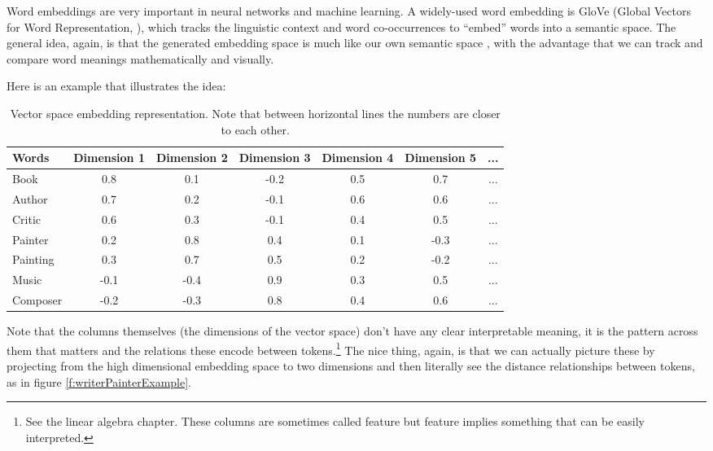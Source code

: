 Word embeddings are very important in neural networks and machine learning. A widely-used word embedding is GloVe (Global Vectors for Word Representation, \cite{pennington2014glove}), which tracks the linguistic context and word co-occurrences to ``embed'' words into a semantic space. The general idea, again, is that the generated embedding space is much like our own semantic space \cite{lewis2019distributional}, with the advantage that we can track and compare word meanings mathematically and visually.

Here is an example that illustrates the idea:
\begin{table}[h]
    \centering
    \begin{tabular}{|l|c|c|c|c|c|c|}
    \hline
    Words & Dimension 1 & Dimension 2 & Dimension 3 & Dimension 4 & Dimension 5 & ... \\
    \hline
    Book    & 0.8 & 0.1 & -0.2 & 0.5 & 0.7 & ... \\
    Author  & 0.7 & 0.2 & -0.1 & 0.6 & 0.6 & ... \\
    Critic  & 0.6 & 0.3 & -0.1 & 0.4 & 0.5 & ... \\
    \hline
    Painter & 0.2 & 0.8 & 0.4 & 0.1 & -0.3 & ... \\
    Painting& 0.3 & 0.7 & 0.5 & 0.2 & -0.2 & ... \\
    \hline
    Music   & -0.1 & -0.4 & 0.9 & 0.3 & 0.5 & ... \\
    Composer& -0.2 & -0.3 & 0.8 & 0.4 & 0.6 & ... \\
    \hline
    \end{tabular}
    \caption{Vector space embedding representation. Note that between horizontal lines the numbers are closer to each other.}
    \label{exampleEmbeddings}
\end{table}
Note that the columns themselves (the dimensions of the vector space) don't have any clear interpretable meaning, it is the pattern across them that matters and the relations these encode between tokens.\footnote{See the linear algebra chapter. These columns are sometimes called feature but feature implies something that can be easily interpreted.}  The nice thing, again, is that we can actually picture these by projecting from the high dimensional embedding space to two dimensions and then literally see the distance relationships between tokens, as in figure \ref{f:writerPainterExample}.  

